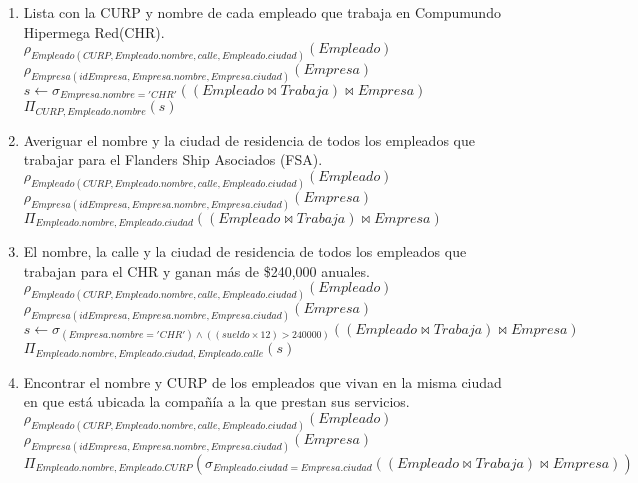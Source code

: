\documentclass{article}
\begin{document}
\begin{enumerate}
			\begin{enumerate}
				\item Lista con la CURP y nombre de cada empleado que trabaja en Compumundo Hipermega Red(CHR).\\
				
				$\rho_{Empleado(CURP, Empleado.nombre, calle, Empleado.ciudad)}(Empleado)$\\
				$\rho_{Empresa(idEmpresa, Empresa.nombre, Empresa.ciudad)}(Empresa)$\\
				$s \leftarrow \sigma_{Empresa.nombre = 'CHR'}((Empleado \bowtie Trabaja) \bowtie Empresa)$\\
				$\Pi_{CURP, Empleado.nombre}(s)$\\
				
				\item Averiguar el nombre y la ciudad de residencia de todos los empleados que trabajar para el
				Flanders Ship Asociados (FSA).\\
				
				$\rho_{Empleado(CURP, Empleado.nombre, calle, Empleado.ciudad)}(Empleado)$\\
				$\rho_{Empresa(idEmpresa, Empresa.nombre, Empresa.ciudad)}(Empresa)$\\
				$\Pi_{Empleado.nombre, Empleado.ciudad}((Empleado \bowtie Trabaja) \bowtie Empresa)$\\
				
				\item El nombre, la calle y la ciudad de residencia de todos los empleados que trabajan para el CHR
				y ganan más de \$240,000 anuales.\\
				
				$\rho_{Empleado(CURP, Empleado.nombre, calle, Empleado.ciudad)}(Empleado)$\\
				$\rho_{Empresa(idEmpresa, Empresa.nombre, Empresa.ciudad)}(Empresa)$\\
				$s \leftarrow \sigma_{(Empresa.nombre = 'CHR') \land ((sueldo \times 12) > 240 000)}((Empleado \bowtie Trabaja) \bowtie Empresa)$\\
				$\Pi_{Empleado.nombre, Empleado.ciudad, Empleado.calle}(s)$\\
				
				\item Encontrar el nombre y CURP de los empleados que vivan en la misma ciudad en que está
				ubicada la compañía a la que prestan sus servicios.\\
				
				$\rho_{Empleado(CURP, Empleado.nombre, calle, Empleado.ciudad)}(Empleado)$\\
				$\rho_{Empresa(idEmpresa, Empresa.nombre, Empresa.ciudad)}(Empresa)$\\
				$\Pi_{Empleado.nombre, Empleado.CURP}(\sigma_{Empleado.ciudad = Empresa.ciudad}((Empleado \bowtie Trabaja) \bowtie Empresa))$\\
				

\end{enumerate}
\end{enumerate}
\end{document}
